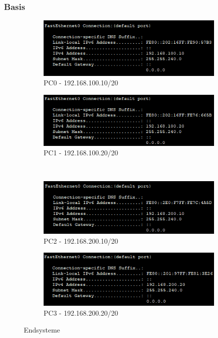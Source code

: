 \subsubsection{Basis}
\begin{figure}[!htb]
    \centering
    \begin{subfigure}{.49\textwidth}
        \includegraphics[width=\textwidth]{./img/build/pc0.png}
        \caption{PC0 - 192.168.100.10/20}
    \end{subfigure}
    \begin{subfigure}{.49\textwidth}
        \includegraphics[width=\textwidth]{./img/build/pc1.png}
        \caption{PC1 - 192.168.100.20/20}
    \end{subfigure}
    ~
    \begin{subfigure}{.49\textwidth}
        \includegraphics[width=\textwidth]{./img/build/pc2.png}
        \caption{PC2 - 192.168.200.10/20}
    \end{subfigure}
    \begin{subfigure}{.49\textwidth}
        \includegraphics[width=\textwidth]{./img/build/pc3.png}
        \caption{PC3 - 192.168.200.20/20}
    \end{subfigure}
    \caption{Endsysteme}
\end{figure}

